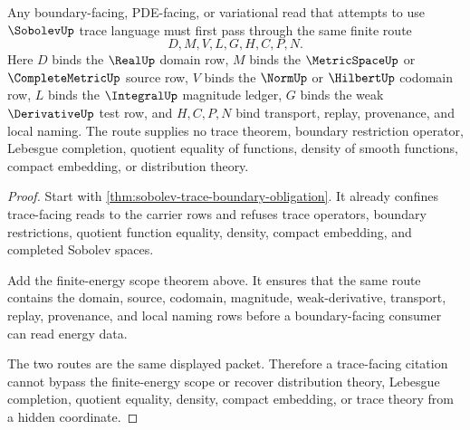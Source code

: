 \begin{theorem}
\label{thm:sobolev-trace-boundary-obligation-route}
Any boundary-facing, PDE-facing, or variational read that attempts to use $\SobolevUp$ trace language must first pass through the same finite route
$$
D,M,V,L,G,H,C,P,N .
$$
Here $D$ binds the $\RealUp$ domain row, $M$ binds the $\MetricSpaceUp$ or $\CompleteMetricUp$ source row, $V$ binds the $\NormUp$ or $\HilbertUp$ codomain row, $L$ binds the $\IntegralUp$ magnitude ledger, $G$ binds the weak $\DerivativeUp$ test row, and $H,C,P,N$ bind transport, replay, provenance, and local naming. The route supplies no trace theorem, boundary restriction operator, Lebesgue completion, quotient equality of functions, density of smooth functions, compact embedding, or distribution theory.
\end{theorem}
\begin{proof}
Start with \autoref{thm:sobolev-trace-boundary-obligation}. It already confines trace-facing reads to the carrier rows and refuses trace operators, boundary restrictions, quotient function equality, density, compact embedding, and completed Sobolev spaces.

Add the finite-energy scope theorem above. It ensures that the same route contains the domain, source, codomain, magnitude, weak-derivative, transport, replay, provenance, and local naming rows before a boundary-facing consumer can read energy data.

The two routes are the same displayed packet. Therefore a trace-facing citation cannot bypass the finite-energy scope or recover distribution theory, Lebesgue completion, quotient equality, density, compact embedding, or trace theory from a hidden coordinate.
\end{proof}

